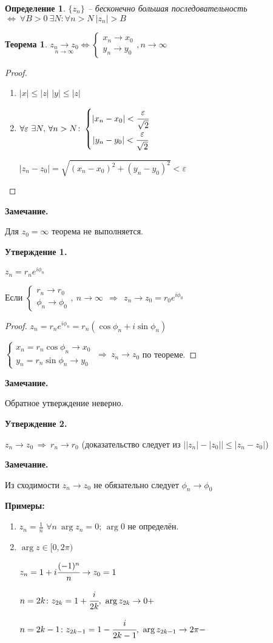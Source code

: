 \documentclass[draft]{article}
\newcommand{\forcenewline}{$\phantom{\mbox{newline}}$\newline}
\newcommand{\then}{\ \Rightarrow\ }
\newcommand{\LRA}{\Leftrightarrow}
\newcommand{\ninf}[1]{\underset{n\to\infty}{#1}}
\renewcommand{\f}{\phi}
\newcommand{\e}{\varepsilon}
\newcommand{\sys}[1]{\left\{\begin{matrix}#1\end{matrix}\right.}
\newcommand{\opr}[1]{\begin{opred}#1\end{opred}}
\newtheorem*{theor}{Теорема}
\newtheorem*{opred}{Определение}
\theoremstyle{remark}
\begin{document}
\opr{$\{z_n\}$ -- бесконечно большая последовательность $\LRA\ \forall B>0\ \exists N\colon \forall n>N\ |z_n|>B$}

\begin{theor}
$\ninf{z_n\to z_0}\LRA\sys{x_n\to x_0 \\ y_n\to y_0},n\to\infty$
\end{theor}

\begin{proof}
\forcenewline
\begin{enumerate}
\item $|x|\leq|z|$
$|y|\leq|z|$
\item $\forall\e\ \exists N,\,\forall n>N\colon
\sys{|x_n-x_0|<\cfrac\e{\sqrt{2}} \\ |y_n-y_0|<\cfrac\e{\sqrt{2}}}$

$|z_n-z_0|=\sqrt{(x_n-x_0)^2+(y_n-y_0)^2}<\e$
\end{enumerate}
\end{proof}

{\bfseries Замечание.}

Для $z_0=\infty$ теорема не выполняется.

{\bfseries Утверждение 1.}

$z_n=r_ne^{i\f_n}$

Если $\sys{r_n\to r_0 \\ \f_n \to \f_0},\ n\to\infty\ \then\ z_n\to z_0=r_0e^{i\f_0}$

\begin{proof}
$z_n=r_ne^{i\f_n}=r_n(\cos\f_n+i\sin\f_n)$

$\sys{x_n=r_n\cos\f_n\to x_0 \\ y_n=r_n\sin\f_n\to y_0}\then z_n\to z_0$ по теореме.
\end{proof}

{\bfseries Замечание.}

Обратное утверждение неверно.

{\bfseries Утверждение 2.}

$z_n\to z_0\then r_n\to r_0$ (доказательство следует из $\bigl||z_n|-|z_0|\bigr|\leq|z_n-z_0|$)

{\bfseries Замечание.}

Из сходимости $z_n\to z_0$ не обязательно следует $\f_n\to\f_0$

{\bfseries Примеры:}
\begin{enumerate}
\item $z_n=\frac1n$ $\forall n\ \arg z_n=0$; $\arg 0$ не определён.
\item $\arg z\in[0,2\pi)$

$z_n=1+i\cfrac{(-1)^n}{n}\to z_0=1$

$n=2k\colon z_{2k}=1+\cfrac{i}{2k},\ \arg z_{2k}\to0+$

$n=2k-1\colon z_{2k-1}=1-\cfrac{i}{2k-1},\ \arg z_{2k-1}\to2\pi-$
\end{enumerate}
\end{document}
